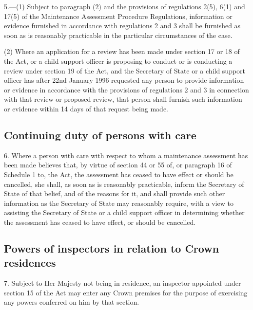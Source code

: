 \documentclass[a4paper,12pt]{article}
\begin{document}
5.—(1) Subject to paragraph (2) and the provisions of regulations 2(5), 6(1) and 17(5) of the Maintenance Assessment Procedure Regulations, information or evidence furnished in accordance with regulations 2 and 3 shall be furnished as soon as is reasonably practicable in the particular circumstances of the case.

(2) Where an application for a review has been made under section 17 or 18 of the Act, or a child support officer is proposing to conduct or is conducting a review under section 19 of the Act, and the Secretary of State or a child support officer has after 22nd January 1996 requested any person to provide information or evidence in accordance with the provisions of regulations 2 and 3 in connection with that review or proposed review, that person shall furnish such information or evidence within 14 days of that request being made.


\subsection[6. Continuing duty of persons with care]{Continuing duty of persons with care}

6.  Where a person with care with respect to whom a maintenance assessment has been made believes that, by virtue of section 44 or 55 of, or paragraph 16 of Schedule 1 to, the Act, the assessment has ceased to have effect or should be cancelled, she shall, as soon as is reasonably practicable, inform the Secretary of State of that belief, and of the reasons for it, and shall provide such other information as the Secretary of State may reasonably require, with a view to assisting the Secretary of State or a child support officer in determining whether the assessment has ceased to have effect, or should be cancelled.

\subsection[7. Powers of inspectors in relation to Crown residences]{Powers of inspectors in relation to Crown residences}

7.  Subject to Her Majesty not being in residence, an inspector appointed under section 15 of the Act may enter any Crown premises for the purpose of exercising any powers conferred on him by that section.
\end{document}
